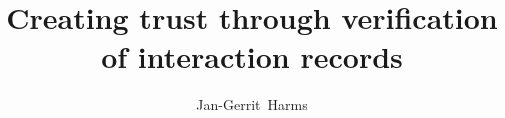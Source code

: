 \documentclass[whitelogo]{tudelft-report}
\theoremstyle{plain}
\theoremstyle{definition}
\begin{document}
\frontmatter


\title[tudelft-white]{Creating trust through verification of interaction records}
\author[tudelft-white]{Jan-Gerrit\ Harms}
\titleoffsetx{100cm}
\titleoffsety{100cm}
\afiloffsetx{10cm}
\afiloffsety{180cm}
\makecover








\tableofcontents

\mainmatter













% 





\appendix

%


\end{document}
